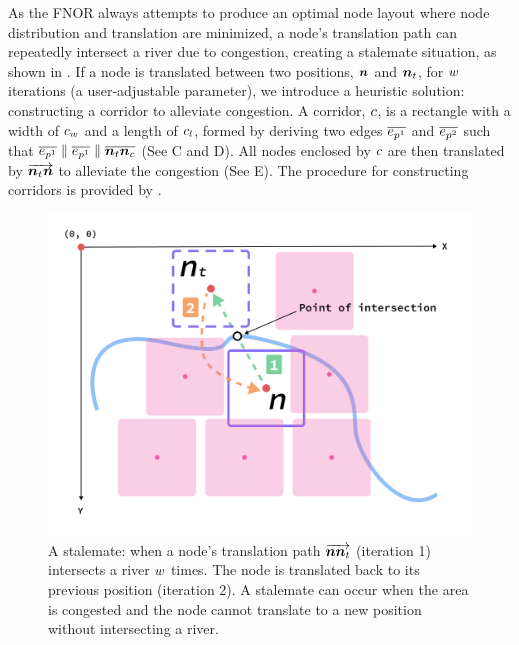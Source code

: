 As the FNOR always attempts to produce an optimal node layout where node distribution and translation are minimized, a node's translation path can repeatedly intersect a river due to congestion, creating a stalemate situation, as shown in . If a node is translated between two positions, $ \bm{n} $ and $ \bm{n}_t $, for $ w $ iterations (a user-adjustable parameter), we introduce a heuristic solution: constructing a corridor to alleviate congestion. A corridor, $ c $, is a rectangle with a width of $ c_w $ and a length of $ c_l $, formed by deriving two edges $ \protect\overline{e_{p^1}} $ and $ \protect\overline{e_{p^2}} $ such that $ \protect\overline{e_{p^1}} \parallel \protect\overline{e_{p^1}} \parallel \protect\overline{\bm{n}_t\bm{n}_c} $ (See C and D). All nodes enclosed by $ c $ are then translated by $ \protect\overrightarrow{\bm{n}_t\bm{n}} $ to alleviate the congestion (See E). The procedure for constructing corridors is provided by .

   
    {
        \begin{figure}[tb!]
            \centering
            \includegraphics[width=\columnwidth,keepaspectratio]{figure/stalemate.png}
            \caption{A stalemate: when a node's translation path $ \protect\overrightarrow{\bm{n}\bm{n}_t} $ (iteration 1) intersects a river $ w $ times. The node is translated back to its previous position (iteration 2). A stalemate can occur when the area is congested and the node cannot translate to a new position without intersecting a river.}
            \label{fig:stalemate}
        \end{figure}
    }

